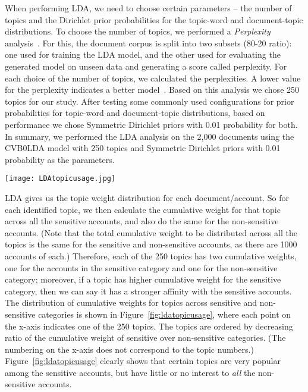 \documentclass[conference]{IEEEtran}
\begin{document}
When performing LDA, we need to choose certain parameters -- the number of topics and the Dirichlet prior probabilities for the topic-word and document-topic distributions.
To choose the number of topics, we performed a \textit{Perplexity} analysis~\cite{blei2003lda}. For this, the document corpus is split into two subsets (80-20 ratio): one used for training the LDA model, and the other used for evaluating the generated model on unseen data and generating a score called perplexity. 
For each choice of the number of topics, we calculated the perplexities. A lower value for the perplexity indicates a better model~\cite{blei2003lda}. 
Based on this analysis we chose 250 topics for our study.
After testing some commonly used configurations for prior probabilities for topic-word and document-topic distributions, based on performance we chose Symmetric Dirichlet priors with 0.01 probability for both. In summary, we performed the LDA analysis on the 2,000 documents using the CVB0LDA model with 250 topics and Symmetric Dirichlet priors with 0.01 probability as the parameters.

\begin{figure*}[thb]
\begin{center}
  \centering
  \caption{Topic Usage Across Sensitive and Non-Sensitive Accounts Ordered by the Decreasing Ratio of Cumulative Weight of Sensitive Over Non-sensitive (Numbers on x-axis do not Correspond to Topic Numbers)}
  \label{fig:ldatopicusage}
     \texttt{[image: LDAtopicusage.jpg]}
\end{center}
\end{figure*}

LDA gives us the topic weight distribution for each document/account. So for each identified topic, we then calculate the cumulative weight for that topic across all the sensitive accounts, and also do the same for the non-sensitive accounts. (Note that the total cumulative weight to be distributed across all the topics is the same for the sensitive and non-sensitive accounts, as there are 1000 accounts
of each.) Therefore, each of the 250 topics has  two cumulative weights, one for the accounts in the sensitive category and one for the non-sensitive category; moreover, if a topic has higher cumulative weight for the sensitive category, then we can say it has a stronger affinity with the sensitive accounts. The distribution of cumulative weights for topics across sensitive and non-sensitive categories is shown in Figure~\ref{fig:ldatopicusage}, where each point on the x-axis indicates one of the 250 topics. The topics are ordered by decreasing ratio of the cumulative weight of sensitive over non-sensitive categories. (The numbering on the x-axis does not correspond to the topic numbers.) Figure~\ref{fig:ldatopicusage} clearly shows that certain topics are very popular among the sensitive accounts, but have little or no interest to {\em all}
the non-sensitive accounts.
\end{document}
